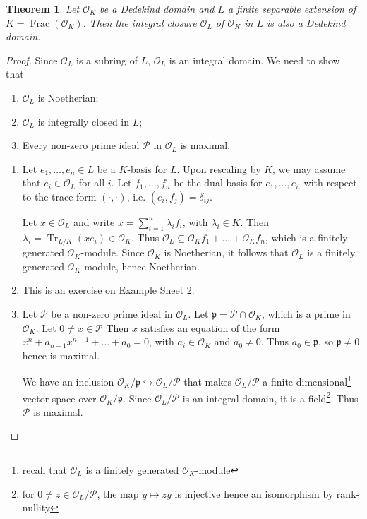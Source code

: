 \documentclass[11pt]{article}
\theoremstyle{definition}
\theoremstyle{plain}
\newtheorem{theorem}[definition]{Theorem}
\theoremstyle{remark}
\DeclareMathOperator{\Frac}{Frac}
\DeclareMathOperator{\Tr}{Tr}
\newcommand{\cO}{\mathcal{O}}
\newcommand{\cP}{\mathcal{P}}
\newcommand{\fp}{\mathfrak{p}}
\begin{document}
\begin{theorem}\label{thm:10_2}
    Let $\cO_K$ be a Dedekind domain and $L$ a finite separable extension of $K = \Frac(\cO_K)$. Then the integral closure $\cO_L$ of $\cO_K$ in $L$ is also a Dedekind domain.
\end{theorem}
\begin{proof}
    Since $\cO_L$ is a subring of $L$, $\cO_L$ is an integral domain. We need to show that
    \begin{enumerate}
        \item $\cO_L$ is Noetherian;
        \item $\cO_L$ is integrally closed in $L$;
        \item Every non-zero prime ideal $\cP$ in $\cO_L$ is maximal.
    \end{enumerate}

    \begin{enumerate}
        \item Let $e_1, \ldots, e_n \in L$ be a $K$-basis for $L$. Upon rescaling by $K$, we may assume that $e_i \in \cO_L$ for all $i$. Let $f_1, \ldots, f_n$ be the dual basis for $e_1, \ldots, e_n$ with respect to the trace form $(\cdot, \cdot)$, i.e. $(e_i, f_j) = \delta_{ij}$.

            Let $x \in \cO_L$ and write $x = \sum_{i=1}^n \lambda_i f_i$, with $\lambda_i \in K$. Then $\lambda_i = \Tr_{L/K}(x e_i) \in \cO_K$. Thus $\cO_L \subseteq \cO_K f_1 + \ldots + \cO_K f_n$, which is a finitely generated $\cO_K$-module. Since $\cO_K$ is Noetherian, it follows that $\cO_L$ is a finitely generated $\cO_K$-module, hence Noetherian.

        \item This is an exercise on Example Sheet 2.

        \item Let $\cP$ be a non-zero prime ideal in $\cO_L$. Let $\fp = \cP \cap \cO_K$, which is a prime in $\cO_K$. Let $0 \neq x \in \cP$ Then $x$ satisfies an equation of the form $x^n + a_{n-1}x^{n-1} + \ldots + a_0 = 0$, with $a_i \in \cO_K$ and $a_0 \neq 0$. Thus $a_0 \in \fp$, so $\fp \neq 0$ hence is maximal.

            We have an inclusion $\cO_K / \fp \hookrightarrow \cO_L / \cP$ that makes $\cO_L / \cP$ a finite-dimensional\footnote{recall that $\cO_L$ is a finitely generated $\cO_K$-module} vector space over $\cO_K / \fp$. Since $\cO_L / \cP$ is an integral domain, it is a field\footnote{for $0 \neq z \in \cO_L / \cP$, the map $y \mapsto z y$ is injective hence an isomorphism by rank-nullity}. Thus $\cP$ is maximal. \qedhere
    \end{enumerate}
\end{proof}
\end{document}
